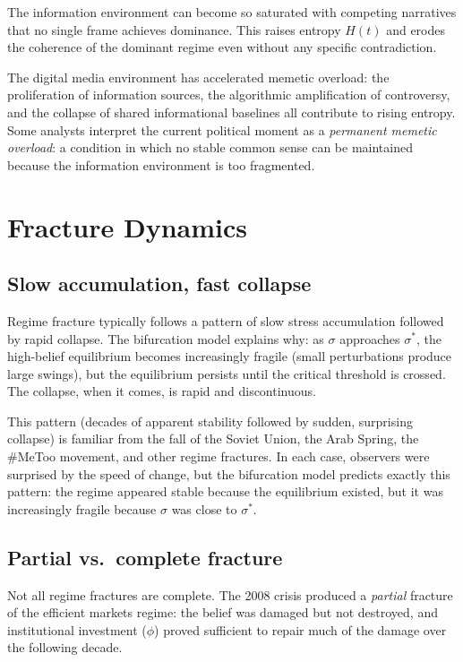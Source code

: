 The information environment can become so saturated with competing narratives that no single frame achieves dominance.
This raises entropy $H(t)$ and erodes the coherence of the dominant regime even without any specific contradiction.

The digital media environment has accelerated memetic overload: the proliferation of information sources, the algorithmic amplification of controversy, and the collapse of shared informational baselines all contribute to rising entropy.
Some analysts interpret the current political moment as a \emph{permanent memetic overload}: a condition in which no stable common sense can be maintained because the information environment is too fragmented.

\section{Fracture Dynamics}
\label{sec:ch30-dynamics}

\subsection{Slow accumulation, fast collapse}

Regime fracture typically follows a pattern of slow stress accumulation followed by rapid collapse.
The bifurcation model explains why: as $\sigma$ approaches $\sigma^*$, the high-belief equilibrium becomes increasingly fragile (small perturbations produce large swings), but the equilibrium persists until the critical threshold is crossed.
The collapse, when it comes, is rapid and discontinuous.

This pattern (decades of apparent stability followed by sudden, surprising collapse) is familiar from the fall of the Soviet Union, the Arab Spring, the \#MeToo movement, and other regime fractures.
In each case, observers were surprised by the speed of change, but the bifurcation model predicts exactly this pattern: the regime appeared stable because the equilibrium existed, but it was increasingly fragile because $\sigma$ was close to $\sigma^*$.

\subsection{Partial vs.\ complete fracture}

Not all regime fractures are complete.
The 2008 crisis produced a \emph{partial} fracture of the efficient markets regime: the belief was damaged but not destroyed, and institutional investment ($\phi$) proved sufficient to repair much of the damage over the following decade.

